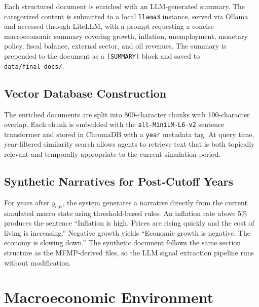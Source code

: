 Each structured document is enriched with an LLM-generated summary. The categorized content is submitted to a local \texttt{llama3} instance, served via Ollama and accessed through LiteLLM, with a prompt requesting a concise macroeconomic summary covering growth, inflation, unemployment, monetary policy, fiscal balance, external sector, and oil revenues. The summary is prepended to the document as a \texttt{[SUMMARY]} block and saved to \texttt{data/final\_docs/}.

\subsection{Vector Database Construction}

The enriched documents are split into 800-character chunks with 100-character overlap. Each chunk is embedded with the \texttt{all-MiniLM-L6-v2} sentence transformer and stored in ChromaDB with a \texttt{year} metadata tag. At query time, year-filtered similarity search allows agents to retrieve text that is both topically relevant and temporally appropriate to the current simulation period.


\subsection{Synthetic Narratives for Post-Cutoff Years}

For years after $y_{\text{cut}}$, the system generates a narrative directly from the current simulated macro state using threshold-based rules. An inflation rate above 5\% produces the sentence ``Inflation is high. Prices are rising quickly and the cost of living is increasing.'' Negative growth yields ``Economic growth is negative. The economy is slowing down.'' The synthetic document follows the same section structure as the MFMP-derived files, so the LLM signal extraction pipeline runs without modification.

\section{Macroeconomic Environment}
\label{sec:economy}

